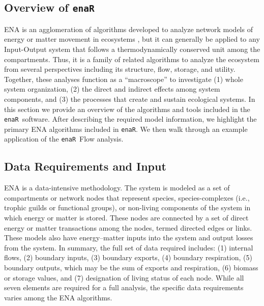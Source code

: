 \documentclass[11pt]{article}
\newcommand{\enaR}{\texttt{enaR}}
\begin{document}
\begin{spacing}{2}
\section{Overview of \enaR}
ENA is an agglomeration of algorithms developed to analyze network
models of energy or matter movement in ecosystems
\citep[e.g.,][]{hannon73, fath99_review, ulanowicz86}, but it can
generally be applied to any Input-Output system that follows a
thermodynamically conserved unit among the compartments.  Thus, it is a
family of related algorithms to analyze the ecosystem from several
perspectives including its structure, flow, storage, and utility.
Together, these analyses function as a ``macroscope'' to investigate
(1) whole system organization, (2) the direct and indirect effects
among system components, and (3) the processes that create and sustain
ecological systems.
In this section we provide an overview of the algorithms and tools
included in the \enaR\ software.  After describing the required model
information, we highlight the primary ENA algorithms included in
\enaR .  We then walk through an example application of the \enaR\ Flow
analysis.

\subsection{Data Requirements and Input}
ENA is a data-intensive methodology.  The system is modeled as a set
of compartments or network nodes that represent species,
species-complexes (i.e., trophic guilds or functional groups), or
non-living components of the system in which energy or matter is
stored.  These nodes are connected by a set of direct energy or matter
transactions among the nodes, termed directed edges or links.  These
models also have energy--matter inputs into the system and output
losses from the system.  In summary, the full set of data required includes:
(1) internal flows, (2) boundary inputs, (3) boundary exports, (4)
boundary respiration, (5) boundary outputs, which may be the sum of
exports and respiration, (6) biomass or storage values, and (7)
designation of living status of each node.  While all seven elements
are required for a full analysis, the specific data requirements
varies among the ENA algorithms.


\end{spacing}
\end{document}
